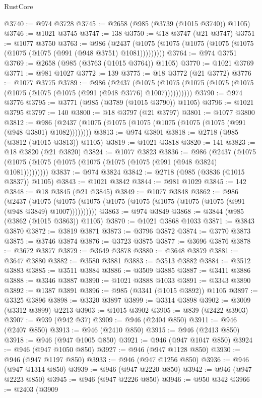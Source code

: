 \begin{lexlean}{RustCore}
\begin{coremodule}
@3740 := @974 @3728
@3745 := @2658 (@985 (@3739 (@1015 @3740)) @1105)
@3746 := @1021 @3745
@3747 := 138
@3750 := @18 @3747 (@21 @3747)
@3751 := @1077 @3750
@3763 := @986
    (@2437 (@1075 (@1075 (@1075 (@1075 (@1075 (@1075 (@1075 (@991 (@948 @3751) @1081)))))))))
@3764 := @974 @3751
@3769 := @2658 (@985 (@3763 (@1015 @3764)) @1105)
@3770 := @1021 @3769
@3771 := @981 @1027
@3772 := 139
@3775 := @18 @3772 (@21 @3772)
@3776 := @1077 @3775
@3789 := @986
    (@2437
      (@1075 (@1075 (@1075 (@1075 (@1075 (@1075 (@1075 (@1075 (@991 (@948 @3776) @1007))))))))))
@3790 := @974 @3776
@3795 := @3771 (@985 (@3789 (@1015 @3790)) @1105)
@3796 := @1021 @3795
@3797 := 140
@3800 := @18 @3797 (@21 @3797)
@3801 := @1077 @3800
@3812 := @986 (@2437 (@1075 (@1075 (@1075 (@1075 (@1075 (@1075 (@991 (@948 @3801) @1082))))))))
@3813 := @974 @3801
@3818 := @2718 (@985 (@3812 (@1015 @3813)) @1105)
@3819 := @1021 @3818
@3820 := 141
@3823 := @18 @3820 (@21 @3820)
@3824 := @1077 @3823
@3836 := @986
    (@2437 (@1075 (@1075 (@1075 (@1075 (@1075 (@1075 (@1075 (@991 (@948 @3824) @1081)))))))))
@3837 := @974 @3824
@3842 := @2718 (@985 (@3836 (@1015 @3837)) @1105)
@3843 := @1021 @3842
@3844 := @981 @1029
@3845 := 142
@3848 := @18 @3845 (@21 @3845)
@3849 := @1077 @3848
@3862 := @986
    (@2437
      (@1075 (@1075 (@1075 (@1075 (@1075 (@1075 (@1075 (@1075 (@991 (@948 @3849) @1007))))))))))
@3863 := @974 @3849
@3868 := @3844 (@985 (@3862 (@1015 @3863)) @1105)
@3870 := @1021 @3868 @1033
@3871 := @3843 @3870
@3872 := @3819 @3871
@3873 := @3796 @3872
@3874 := @3770 @3873
@3875 := @3746 @3874
@3876 := @3723 @3875
@3877 := @3696 @3876
@3878 := @3672 @3877
@3879 := @3649 @3878
@3880 := @3648 @3879
@3881 := @3647 @3880
@3882 := @3580 @3881
@3883 := @3513 @3882
@3884 := @3512 @3883
@3885 := @3511 @3884
@3886 := @3509 @3885
@3887 := @3411 @3886
@3888 := @3346 @3887
@3890 := @1021 @3888 @1033
@3891 := @3343 @3890
@3892 := @1387 @3891
@3896 := @985 (@3341 (@1015 @3892)) @1105
@3897 := @3325 @3896
@3898 := @3320 @3897
@3899 := @3314 @3898
@3902 := @3009 (@3312 @3899) @2213
@3903 := @1015 @3902
@3905 := @839 (@2422 @3903)
@3907 := @939 (@942 @37)
@3909 := @946 (@2404 @850)
@3911 := @946 (@2407 @850)
@3913 := @946 (@2410 @850)
@3915 := @946 (@2413 @850)
@3918 := @946 (@947 @1005 @850)
@3921 := @946 (@947 @1047 @850)
@3924 := @946 (@947 @1050 @850)
@3927 := @946 (@947 @1128 @850)
@3930 := @946 (@947 @1197 @850)
@3933 := @946 (@947 @1256 @850)
@3936 := @946 (@947 @1314 @850)
@3939 := @946 (@947 @2220 @850)
@3942 := @946 (@947 @2223 @850)
@3945 := @946 (@947 @2226 @850)
@3946 := @950 @342
@3966 := @2403
    (@3909

\end{coremodule}
\end{lexlean}
